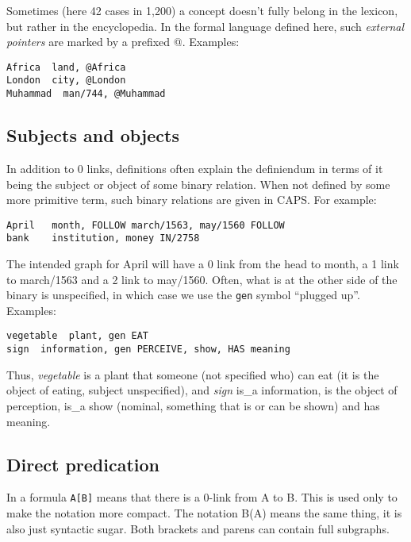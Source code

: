 \documentclass[11pt,bookmarks,bookmarksnumbered,naturalnames,plainpages=false,pdftex,colorlinks=true,urlcolor=blue,bookmarksdepth=subsection,plainpages=false]{paper}
\begin{document}
Sometimes (here 42 cases in 1,200) a concept doesn't fully belong in the
lexicon, but rather in the encyclopedia. In the formal language defined here,
such {\it external pointers} are marked by a prefixed @. Examples:

\begin{verbatim}
Africa	land, @Africa	
London	city, @London	
Muhammad  man/744, @Muhammad	
\end{verbatim}

\subsection{Subjects and objects}\label{subjobj}

In addition to 0 links, definitions often explain the definiendum in terms of
it being the subject or object of some binary relation. When not defined by
some more primitive term, such binary relations are given in CAPS.  For
example:

\begin{verbatim}
April   month, FOLLOW march/1563, may/1560 FOLLOW
bank    institution, money IN/2758
\end{verbatim}

\noindent
The intended graph for April will have a 0 link from the head to month, a 1
link to march/1563 and a 2 link to may/1560. Often, what is at the other side
of the binary is unspecified, in which case we use the {\tt gen} symbol ``plugged
up''.  Examples:

\begin{verbatim}
vegetable  plant, gen EAT
sign  information, gen PERCEIVE, show, HAS meaning
\end{verbatim}

\noindent
Thus, {\it vegetable} is a plant that someone (not specified who) can eat (it
is the object of eating, subject unspecified), and {\it sign} is\_a
information, is the object of perception, is\_a show (nominal, something that
is or can be shown) and has meaning.

\subsection{Direct predication}\label{isa}

In a formula {\tt A[B]} means that there is a 0-link from A to B. This is used
only to make the notation more compact. The notation B(A) means the same
thing, it is also just syntactic sugar. Both brackets and parens can contain
full subgraphs. 
\end{document}
